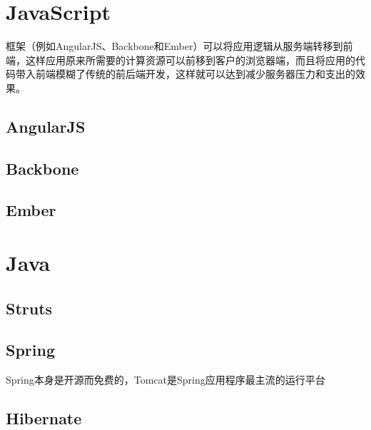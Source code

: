 \chapter{JavaScript}

框架（例如AngularJS、Backbone和Ember）可以将应用逻辑从服务端转移到前端，这样应用原来所需要的计算资源可以前移到客户的浏览器端，而且将应用的代码带入前端模糊了传统的前后端开发，这样就可以达到减少服务器压力和支出的效果。


\section{AngularJS}





\section{Backbone}





\section{Ember}





\chapter{Java}





\section{Struts}





\section{Spring}

Spring本身是开源而免费的，Tomcat是Spring应用程序最主流的运行平台





\section{Hibernate}




